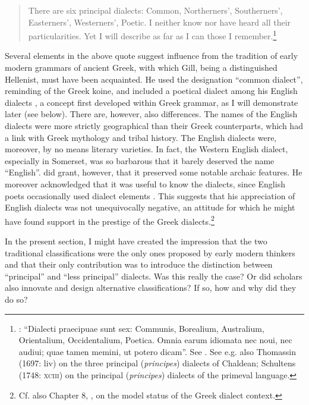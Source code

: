 \begin{quote}
There are six principal dialects: Common, Northerners’, Southerners’, Easterners’, Westerners’, Poetic. I neither know nor have heard all their particularities. Yet I will describe as far as I can those I remember.\footnote{\citet[15]{Gill1619}: “Dialecti praecipuae sunt sex: Communis, Borealium, Australium, Orientalium, Occidentalium, Poetica. Omnia earum idiomata nec noui, nec audiui; quae tamen memini, ut potero dicam”. See \citet{Kökeritz1938}. See e.g. also Thomassin (1697: liv) on the three principal (\textit{principes}) dialects of Chaldean; Schultens (1748: \textsc{xciii}) on the principal (\textit{principes}) dialects of the primeval language.}
\end{quote}

Several elements in the above quote suggest influence from the tradition of early modern grammars of ancient Greek, with which Gill, being a distinguished Hellenist, must have been acquainted. He used the designation “common dialect”, reminding of the Greek koine, and included a poetical dialect among his English dialects \citep[18]{Gill1619}, a concept first developed within Greek grammar, as I will demonstrate later (see  below). There are, however, also differences. The names of the English dialects were more strictly geographical than their Greek counterparts, which had a link with Greek mythology and tribal history. The English dialects were, moreover, by no means literary varieties. In fact, the Western English dialect, especially in Somerset, was so barbarous that it barely deserved the name “English”. \citet[17]{Gill1619} did grant, however, that it preserved some notable archaic features. He moreover acknowledged that it was useful to know the dialects, since English poets occasionally used dialect elements \citep[18]{Gill1619}. This suggests that his appreciation of English dialects was not unequivocally negative, an attitude for which he might have found support in the prestige of the Greek dialects.\footnote{Cf. also Chapter 8, , on the model status of the Greek dialect context.}

In the present section, I might have created the impression that the two traditional classifications were the only ones proposed by early modern thinkers and that their only contribution was to introduce the distinction between “principal” and “less principal” dialects. Was this really the case? Or did scholars also innovate and design alternative classifications? If so, how and why did they do so?

